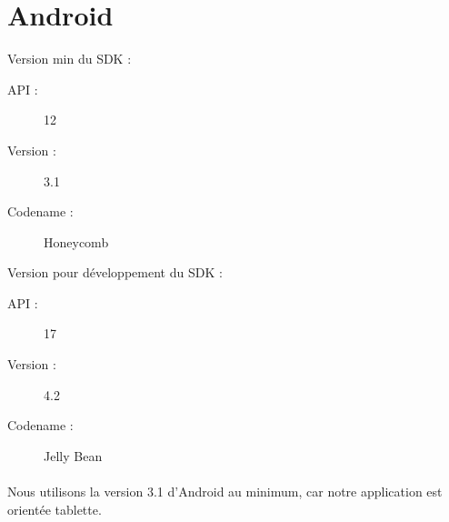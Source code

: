 \section{Android}
Version min du SDK :
\begin{description}
\item[API : ] 12
\item[Version : ] 3.1 
\item[Codename : ] Honeycomb 
\end{description}

Version pour développement du SDK :
\begin{description}
\item[API : ] 17
\item[Version : ] 4.2 
\item[Codename : ] Jelly Bean
\end{description}

\paragraph{}Nous utilisons la version 3.1 d'Android au minimum, car notre application est orientée tablette.